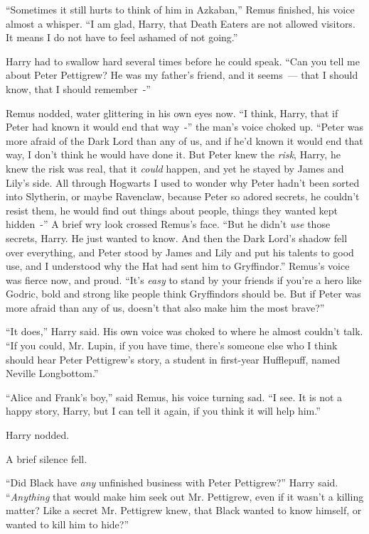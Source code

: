 ``Sometimes it still hurts to think of him in Azkaban,'' Remus finished, his voice almost a whisper. ``I am glad, Harry, that Death Eaters are not allowed visitors. It means I do not have to feel ashamed of not going.''

Harry had to swallow hard several times before he could speak. ``Can you tell me about Peter Pettigrew? He was my father's friend, and it seems~--- that I should know, that I should remember~-''

Remus nodded, water glittering in his own eyes now. ``I think, Harry, that if Peter had known it would end that way~-'' the man's voice choked up. ``Peter was more afraid of the Dark Lord than any of us, and if he'd known it would end that way, I don't think he would have done it. But Peter knew the \emph{risk}, Harry, he knew the risk was real, that it \emph{could} happen, and yet he stayed by James and Lily's side. All through Hogwarts I used to wonder why Peter hadn't been sorted into Slytherin, or maybe Ravenclaw, because Peter so adored secrets, he couldn't resist them, he would find out things about people, things they wanted kept hidden~-'' A brief wry look crossed Remus's face. ``But he didn't \emph{use} those secrets, Harry. He just wanted to know. And then the Dark Lord's shadow fell over everything, and Peter stood by James and Lily and put his talents to good use, and I understood why the Hat had sent him to Gryffindor.'' Remus's voice was fierce now, and proud. ``It's \emph{easy} to stand by your friends if you're a hero like Godric, bold and strong like people think Gryffindors should be. But if Peter was more afraid than any of us, doesn't that also make him the most brave?''

``It does,'' Harry said. His own voice was choked to where he almost couldn't talk. ``If you could, Mr. Lupin, if you have time, there's someone else who I think should hear Peter Pettigrew's story, a student in first-year Hufflepuff, named Neville Longbottom.''

``Alice and Frank's boy,'' said Remus, his voice turning sad. ``I see. It is not a happy story, Harry, but I can tell it again, if you think it will help him.''

Harry nodded.

A brief silence fell.

``Did Black have \emph{any} unfinished business with Peter Pettigrew?'' Harry said. ``\emph{Anything} that would make him seek out Mr. Pettigrew, even if it wasn't a killing matter? Like a secret Mr. Pettigrew knew, that Black wanted to know himself, or wanted to kill him to hide?''

